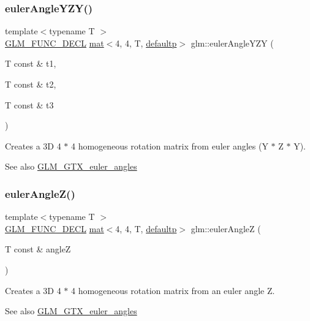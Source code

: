 \subsubsection{\texorpdfstring{euler\+Angle\+Y\+Z\+Y()}{eulerAngleYZY()}}
{\footnotesize\ttfamily template$<$typename T $>$ \\
\hyperlink{setup_8hpp_ab2d052de21a70539923e9bcbf6e83a51}{G\+L\+M\+\_\+\+F\+U\+N\+C\+\_\+\+D\+E\+CL} \hyperlink{structglm_1_1mat}{mat}$<$4, 4, T, \hyperlink{namespaceglm_a36ed105b07c7746804d7fdc7cc90ff25a9d21ccd8b5a009ec7eb7677befc3bf51}{defaultp}$>$ glm\+::euler\+Angle\+Y\+ZY (\begin{DoxyParamCaption}\item[{T const \&}]{t1,  }\item[{T const \&}]{t2,  }\item[{T const \&}]{t3 }\end{DoxyParamCaption})}

Creates a 3D 4 $\ast$ 4 homogeneous rotation matrix from euler angles (Y $\ast$ Z $\ast$ Y). \begin{DoxySeeAlso}{See also}
\hyperlink{group__gtx__euler__angles}{G\+L\+M\+\_\+\+G\+T\+X\+\_\+euler\+\_\+angles} 
\end{DoxySeeAlso}
\mbox{\label{group__gtx__euler__angles_ga5b3935248bb6c3ec6b0d9297d406e251}} 
\subsubsection{\texorpdfstring{euler\+Angle\+Z()}{eulerAngleZ()}}
{\footnotesize\ttfamily template$<$typename T $>$ \\
\hyperlink{setup_8hpp_ab2d052de21a70539923e9bcbf6e83a51}{G\+L\+M\+\_\+\+F\+U\+N\+C\+\_\+\+D\+E\+CL} \hyperlink{structglm_1_1mat}{mat}$<$4, 4, T, \hyperlink{namespaceglm_a36ed105b07c7746804d7fdc7cc90ff25a9d21ccd8b5a009ec7eb7677befc3bf51}{defaultp}$>$ glm\+::euler\+AngleZ (\begin{DoxyParamCaption}\item[{T const \&}]{angleZ }\end{DoxyParamCaption})}

Creates a 3D 4 $\ast$ 4 homogeneous rotation matrix from an euler angle Z. \begin{DoxySeeAlso}{See also}
\hyperlink{group__gtx__euler__angles}{G\+L\+M\+\_\+\+G\+T\+X\+\_\+euler\+\_\+angles} 
\end{DoxySeeAlso}
\mbox{\label{group__gtx__euler__angles_ga483903115cd4059228961046a28d69b5}} 
